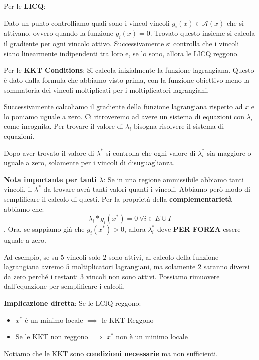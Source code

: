 Per le \textbf{LICQ}:

Dato un punto controlliamo quali sono i vincol vincoli $g_i(x) \in \mathcal{A}(x)$ che si attivano, ovvero quando la funzione $g_i(x) = 0$.
Trovato questo insieme si calcola il gradiente per ogni vincolo attivo. Successivamente si controlla che i vincoli siano 
linearmente indipendenti tra loro e, se lo sono, allora le LICQ reggono.

Per le \textbf{KKT Conditions}:
Si calcola inizialmente la funzione lagrangiana. Questo è dato dalla formula che abbiamo visto prima, con 
la funzione obiettivo meno la sommatoria dei vincoli moltiplicati per i moltiplicatori lagrangiani.

Successivamente calcoliamo il gradiente della funzione lagrangiana rispetto ad $x$ e lo poniamo uguale a zero. Ci ritroveremo 
ad avere un sistema di equazioni con $\lambda_i$ come incognita. Per trovare il valore di $\lambda_i$ bisogna
risolvere il sistema di equazioni.

Dopo aver trovato il valore di $\lambda^*$ si controlla che ogni valore di $\lambda_i^*$ sia maggiore o uguale a zero, 
solamente per i vincoli di disuguaglianza.

\textbf{Nota importante per tanti $\lambda$}: Se in una regione ammissibile abbiamo tanti vincoli, 
il $\lambda^*$ da trovare avrà tanti valori quanti i vincoli. Abbiamo però modo di semplificare 
il calcolo di questi. Per la proprietà della \textbf{complementarietà} abbiamo che:
$$\lambda_i * g_i(x^*) = 0 \ \forall i \in E \cup I$$. Ora, se sappiamo già che 
$g_i(x^*) >0$, allora $\lambda_i^*$ deve \textbf{PER FORZA} essere uguale a zero. 

Ad esempio, se su $5$ vincoli solo $2$ sono attivi, al calcolo della funzione lagrangiana
avremo $5$ moltiplicatori lagrangiani, ma solamente $2$ saranno diversi da zero perché
i restanti $3$ vincoli non sono attivi. Possiamo rimuovere dall'equazione per 
semplificare i calcoli. 

\textbf{Implicazione diretta}: Se le LCIQ reggono:

\begin{itemize}
    \item $x^*$ è un minimo locale $\implies$ le KKT Reggono
    \item Se le KKT non reggono $\implies$ $x^*$ non è un minimo locale
\end{itemize}

Notiamo che le KKT sono \textbf{condizioni necessarie} ma non sufficienti.